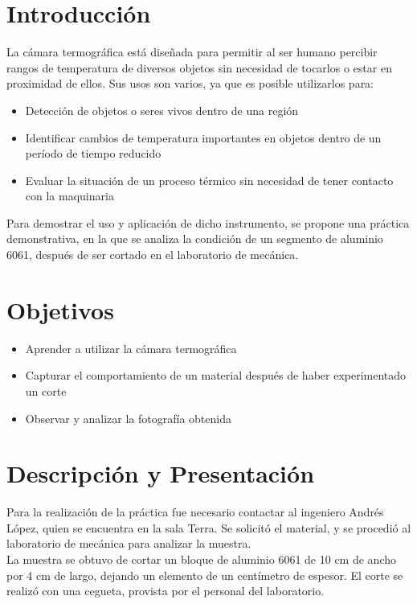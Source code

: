 \section{Introducci\'on}
La c\'amara termogr\'afica est\'a dise\~nada para permitir al ser humano percibir rangos de
temperatura de diversos objetos sin necesidad de tocarlos o estar en proximidad de ellos.
Sus usos son varios, ya que es posible utilizarlos para:
\begin{itemize}
 \item Detecci\'on de objetos o seres vivos dentro de una regi\'on
 \item Identificar cambios de temperatura importantes en objetos dentro de un per\'iodo de tiempo reducido
 \item Evaluar la situaci\'on de un proceso t\'ermico sin necesidad de tener contacto con la maquinaria
\end{itemize}

Para demostrar el uso y aplicaci\'on de dicho instrumento, se propone una pr\'actica demonstrativa,
en la que se analiza la condici\'on de un segmento de aluminio 6061, despu\'es de ser cortado en el laboratorio
de mec\'anica.

\section{Objetivos}
\begin{itemize}
 \item Aprender a utilizar la c\'amara termogr\'afica
 \item Capturar el comportamiento de un material despu\'es de haber experimentado un corte
 \item Observar y analizar la fotograf\'ia obtenida
\end{itemize}

\section{Descripci\'on y Presentaci\'on}
Para la realizaci\'on de la pr\'actica fue necesario contactar al ingeniero Andr\'es L\'opez, quien se encuentra en
la sala Terra. Se solicit\'o el material, y se procedi\'o al laboratorio de mec\'anica para analizar la muestra.\\

La muestra se obtuvo de cortar un bloque de aluminio 6061 de 10 cm de ancho por 4 cm de largo, dejando un elemento
de un cent\'imetro de espesor. El corte se realiz\'o con una cegueta, provista por el personal del laboratorio.